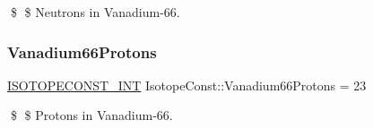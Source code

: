 \$ \$ Neutrons in Vanadium-\/66. \mbox{\label{group___isotope_const-_vanadium-_v66_ga18873adb59a7c3400b8dd6fa83fe769a}} 
\subsubsection{\texorpdfstring{Vanadium66\+Protons}{Vanadium66Protons}}
{\footnotesize\ttfamily \mbox{\hyperlink{group___isotope_const-_macros_ga5f18360b3e99483a35c32d789e62621c}{I\+S\+O\+T\+O\+P\+E\+C\+O\+N\+S\+T\+\_\+\+I\+NT}} Isotope\+Const\+::\+Vanadium66\+Protons = 23}

\$ \$ Protons in Vanadium-\/66. 
